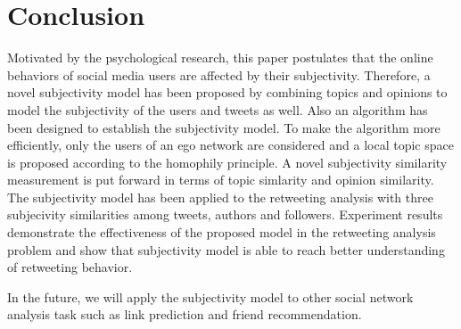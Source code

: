 \documentclass{acm_proc_article-sp}
\begin{document}
\section{Conclusion}
Motivated by the psychological research, this paper postulates that the online behaviors of social media users are affected by their subjectivity. Therefore, a novel subjectivity model has been proposed by combining topics and opinions to model the subjectivity of the users and tweets as well. Also an algorithm has been designed to establish the subjectivity model. To make the algorithm more efficiently, only the users of an ego network are considered and a local topic space is proposed according to the homophily principle. A novel subjectivity similarity measurement is put forward in terms of topic simlarity and opinion similarity. The subjectivity model has been applied to the retweeting analysis with three subjecivity similarities among tweets, authors and followers. 
Experiment results demonstrate the effectiveness of the proposed model in the retweeting analysis problem and show that subjectivity model is able to reach better understanding of retweeting behavior. 

In the future, we will apply the subjectivity model to other social network analysis task such as link prediction and friend recommendation. 


\end{document}
